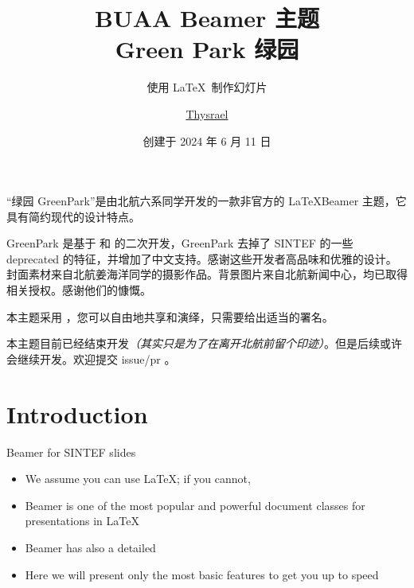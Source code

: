 \documentclass{ctexbeamer}
\title{BUAA Beamer 主题 \\ Green Park 绿园}
\subtitle{使用 \LaTeX\ 制作幻灯片}
\author{\href{https://github.com/Thysrael}{Thysrael}}
\date{创建于 2024 年 6 月 11 日}
\begin{document}
\maketitle

\begin{frame}{}
  “绿园 GreenPark”是由北航六系同学开发的一款非官方的 \LaTeX Beamer 主题，它具有简约现代的设计特点。
  
  GreenPark 是基于  和  的二次开发，GreenPark 去掉了 SINTEF 的一些 deprecated 的特征，并增加了中文支持。感谢这些开发者高品味和优雅的设计。封面素材来自北航姜海洋同学的摄影作品。背景图片来自北航新闻中心，均已取得相关授权。感谢他们的慷慨。

  本主题采用 ，您可以自由地共享和演绎，只需要给出适当的署名。

  本主题目前已经结束开发\textsl{（其实只是为了在离开北航前留个印迹）}。但是后续或许会继续开发。欢迎提交 issue/pr 。

\end{frame}

\section{Introduction}

% 

\begin{frame}{Beamer for SINTEF slides}{\thesection \, \secname}

  \begin{itemize}
  \item We assume you can use \LaTeX; if you cannot,
  \item Beamer is one of the most popular and powerful document
    classes for presentations in \LaTeX
  \item Beamer has also a detailed
  \item Here we will present only the most basic features to get you up to speed
  \end{itemize}

\end{frame}
\end{document}

